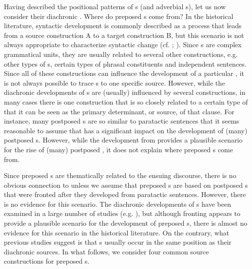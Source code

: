 \documentclass[output=paper]{langsci/langscibook}
\begin{document}
Having described the positional patterns of s (and adverbial s), let us now consider their diachronic . Where do preposed s come from? In the historical literature, syntactic development is commonly described as a process that leads from a source construction A to a target construction B, but this scenario is not always appropriate to characterize syntactic change (cf. \citealt{Givón1991};  \citealt{VandeVeldeEtAl2013}). Since s are complex grammatical units, they are usually related to several other constructions, e.g. other types of s, certain types of phrasal constituents and independent sentences. Since all of these constructions can influence the development of a particular , it is not always possible to trace s to one specific source. However, while the diachronic developments of s are (usually) influenced by several constructions, in many cases there is one construction that is so closely related to a certain type of  that it can be seen as the primary determinant, or source, of that clause. For instance, many postposed s are so similar to paratactic sentences that it seems reasonable to assume that  has a significant impact on the development of (many) postposed s. However, while the development from  provides a plausible scenario for the rise of (many) postposed , it does not explain where preposed s come from.

Since preposed s are thematically related to the ensuing discourse, there is no obvious connection to  unless we assume that preposed s are based on postposed s that were fronted after they developed from paratactic sentences. However, there is no evidence for this scenario. The diachronic developments of s have been examined in a large number of studies (e.g. \citealt{Haiman1985,Haspelmath1989,Givón1991,Genetti1991,HarrisCampbell1995,Frajzyngier1996,DisterheftViti2010}), but although fronting appears to provide a plausible scenario for the development of preposed s, there is almost no evidence for this scenario in the historical literature. On the contrary, what previous studies suggest is that s usually occur in the same position as their diachronic sources. In what follows, we consider four common source constructions for preposed s.
\end{document}
